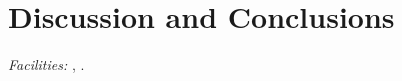 \documentclass[12pt,preprint]{aastex}
\begin{document}
 

\section{Discussion and Conclusions} 

 




\acknowledgments






{\it Facilities:} , .



%
\end{document}
